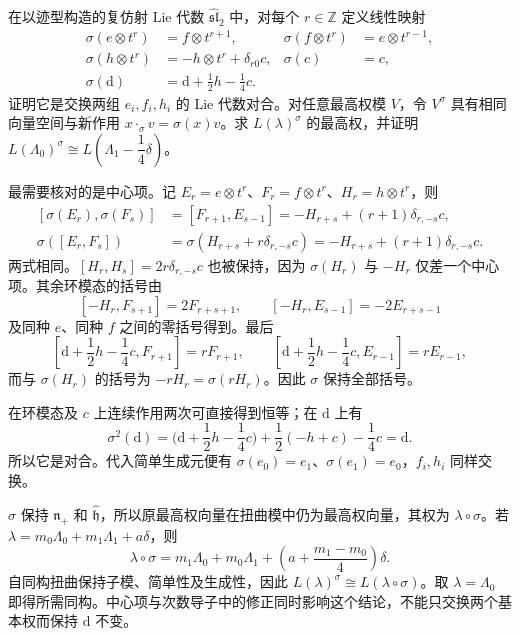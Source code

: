 \begin{exercise}\label{b5:ex:G-affine-node-symmetry}
	在以迹型构造的复仿射 Lie 代数 \(\widehat{\mathfrak{sl}}_2\) 中，对每个 \(r\in\mathbb Z\) 定义线性映射
	\[
		\begin{aligned}
			\sigma(e\otimes t^r)&=f\otimes t^{r+1},&
			\sigma(f\otimes t^r)&=e\otimes t^{r-1},\\
			\sigma(h\otimes t^r)&=-h\otimes t^r+\delta_{r0}c,&
			\sigma(c)&=c,\\
			\sigma(\mathrm d)&=\mathrm d+\frac12h-\frac14c.
		\end{aligned}
	\]
	证明它是交换两组 \(e_i,f_i,h_i\) 的 Lie 代数对合。对任意最高权模 \(V\)，令 \(V^\sigma\) 具有相同向量空间与新作用 \(x\cdot_\sigma v=\sigma(x)v\)。求 \(L(\lambda)^\sigma\) 的最高权，并证明 \(L(\Lambda_0)^\sigma\cong L(\Lambda_1-\dfrac14\delta)\)。
\end{exercise}
\begin{solution}
	最需要核对的是中心项。记 \(E_r=e\otimes t^r\)、\(F_r=f\otimes t^r\)、\(H_r=h\otimes t^r\)，则
	\[
		\begin{aligned}
			[\sigma(E_r),\sigma(F_s)]
			&=[F_{r+1},E_{s-1}]
			=-H_{r+s}+(r+1)\delta_{r,-s}c,\\
			\sigma([E_r,F_s])
			&=\sigma(H_{r+s}+r\delta_{r,-s}c)
			=-H_{r+s}+(r+1)\delta_{r,-s}c.
		\end{aligned}
	\]
	两式相同。\([H_r,H_s]=2r\delta_{r,-s}c\) 也被保持，因为 \(\sigma(H_r)\) 与 \(-H_r\) 仅差一个中心项。其余环模态的括号由
	\[
		[-H_r,F_{s+1}]=2F_{r+s+1},\qquad
		[-H_r,E_{s-1}]=-2E_{r+s-1}
	\]
	及同种 \(e\)、同种 \(f\) 之间的零括号得到。最后
	\[
		[\mathrm d+\frac12h-\frac14c,F_{r+1}]=r F_{r+1},\qquad
		[\mathrm d+\frac12h-\frac14c,E_{r-1}]=r E_{r-1},
	\]
	而与 \(\sigma(H_r)\) 的括号为 \(-r H_r=\sigma(rH_r)\)。因此 \(\sigma\) 保持全部括号。

	在环模态及 \(c\) 上连续作用两次可直接得到恒等；在 \(\mathrm d\) 上有
	\[
		\sigma^2(\mathrm d)
		=\bigl(\mathrm d+\frac12h-\frac14c\bigr)
		+\frac12(-h+c)-\frac14c=\mathrm d.
	\]
	所以它是对合。代入简单生成元便有 \(\sigma(e_0)=e_1\)、\(\sigma(e_1)=e_0\)，\(f_i,h_i\) 同样交换。

	\(\sigma\) 保持 \(\mathfrak n_+\) 和 \(\widehat{\mathfrak h}\)，所以原最高权向量在扭曲模中仍为最高权向量，其权为 \(\lambda\circ\sigma\)。若 \(\lambda=m_0\Lambda_0+m_1\Lambda_1+a\delta\)，则
	\[
		\lambda\circ\sigma
		=m_1\Lambda_0+m_0\Lambda_1
		+\left(a+\frac{m_1-m_0}{4}\right)\delta.
	\]
	自同构扭曲保持子模、简单性及生成性，因此 \(L(\lambda)^\sigma\cong L(\lambda\circ\sigma)\)。取 \(\lambda=\Lambda_0\) 即得所需同构。中心项与次数导子中的修正同时影响这个结论，不能只交换两个基本权而保持 \(\mathrm d\) 不变。
\end{solution}

